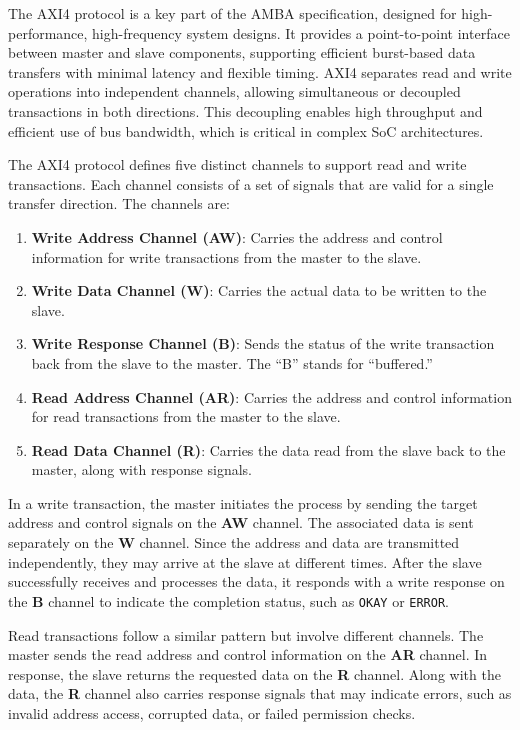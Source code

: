 The \ac{AXI4} protocol is a key part of the AMBA specification, designed for high-performance, high-frequency system designs. It provides a point-to-point interface between master and slave components, supporting efficient burst-based data transfers with minimal latency and flexible timing. AXI4 separates read and write operations into independent channels, allowing simultaneous or decoupled transactions in both directions. This decoupling enables high throughput and efficient use of bus bandwidth, which is critical in complex SoC architectures.\cite{arm_ltd_introduction_2020}


The AXI4 protocol defines five distinct channels to support read and write transactions. Each channel consists of a set of signals that are valid for a single transfer direction. The channels are:\cite{arm_ltd_introduction_2020}

\begin{enumerate}
    \item \textbf{Write Address Channel (AW)}: Carries the address and control information for write transactions from the master to the slave.
    \item \textbf{Write Data Channel (W)}: Carries the actual data to be written to the slave.
    \item \textbf{Write Response Channel (B)}: Sends the status of the write transaction back from the slave to the master. The “B” stands for “buffered.”
    \item \textbf{Read Address Channel (AR)}: Carries the address and control information for read transactions from the master to the slave.
    \item \textbf{Read Data Channel (R)}: Carries the data read from the slave back to the master, along with response signals.
\end{enumerate}

In a write transaction, the master initiates the process by sending the target address and control signals on the \textbf{AW} channel. The associated data is sent separately on the \textbf{W} channel. Since the address and data are transmitted independently, they may arrive at the slave at different times. After the slave successfully receives and processes the data, it responds with a write response on the \textbf{B} channel to indicate the completion status, such as \texttt{OKAY} or \texttt{ERROR}.\cite{arm_ltd_introduction_2020}

Read transactions follow a similar pattern but involve different channels. The master sends the read address and control information on the \textbf{AR} channel. In response, the slave returns the requested data on the \textbf{R} channel. Along with the data, the \textbf{R} channel also carries response signals that may indicate errors, such as invalid address access, corrupted data, or failed permission checks.\cite{arm_ltd_introduction_2020}

